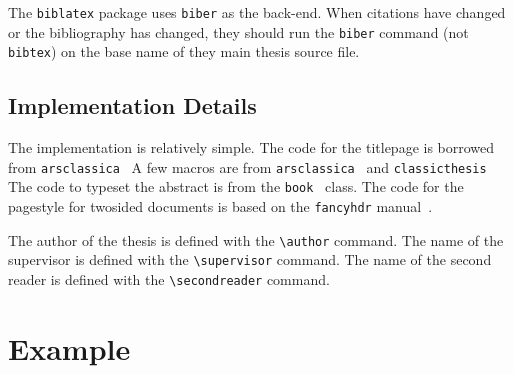 \documentclass[MScDSA]{uccthesis}
\newcommand*{\COMMAND}[1]{\texttt{\textbackslash #1}}
\begin{document}
      The \texttt{biblatex} package uses \texttt{biber} as the back-end.
      When citations have changed or the bibliography has changed,
       they should run the \texttt{biber} command (not \texttt{bibtex})
       on the base name of they main thesis source file.

   \section{Implementation Details}

      The implementation is relatively simple.
      The code for the titlepage is borrowed
       from \texttt{arsclassica}~\Parencite{arsclassica}
      A few macros are from
       \texttt{arsclassica}~\Parencite{arsclassica} and
       \texttt{classicthesis}~\Parencite{classicthesis}
      The code to typeset the abstract is from
       the \texttt{book}~\Parencite{Lamport:94} class.
      The code for the pagestyle for twosided documents
       is based on the \texttt{fancyhdr} manual~\Parencite{fancyhdr}.

      The author of the thesis is defined with
       the \COMMAND{author} command.
      The name of the supervisor is defined with
       the \COMMAND{supervisor} command.
      The name of the second reader is defined with
       the \COMMAND{secondreader} command.

   \chapter{Example}
\end{document}
